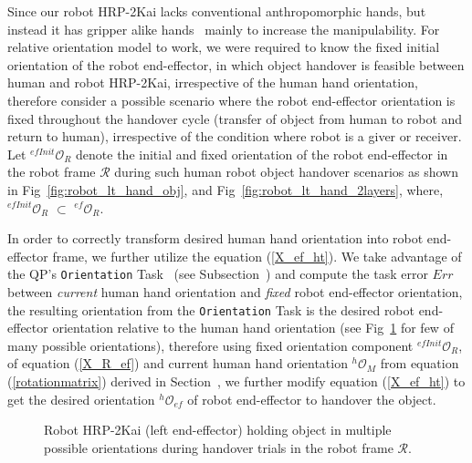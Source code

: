 Since our robot HRP-2Kai lacks conventional anthropomorphic hands, but instead it has gripper alike hands~\cite{kaneko2015humanoid, stasse2019overview} mainly to increase the manipulability. For relative orientation model to work, we were required to know the fixed initial orientation of the robot end-effector, in which object handover is feasible between human and robot HRP-2Kai, irrespective of the human hand orientation, therefore consider a possible  scenario where the robot end-effector orientation is fixed throughout the handover cycle (transfer of object from human to robot and return to human), irrespective of the condition where robot is a giver or receiver. Let ${{}^{efInit}\mathcal{O}_R}$ denote the initial and fixed orientation of the robot end-effector in the robot frame $\mathcal{R}$ during such human robot object handover scenarios as shown in Fig~\ref{fig:robot_lt_hand_obj}, and Fig~\ref{fig:robot_lt_hand_2layers}, where, ${{}^{efInit}\mathcal{O}_R}$ $\subset$ ${{}^{ef}\mathcal{O}_R}$.




In order to correctly transform desired human hand orientation into robot end-effector frame, we further utilize the equation (\ref{X_ef_ht}). We take advantage of the QP's \texttt{Orientation} Task~\cite{murray2017mathematical, ladder-HRP-2Kai} (see Subsection~) and compute the task error $Err$ between \textit{current} human hand orientation and \textit{fixed} robot end-effector orientation, the resulting orientation from the \texttt{Orientation} Task is the desired robot end-effector orientation relative to the human hand orientation (see Fig~\ref{fig:robot_lt_orientations} for few of many possible orientations), therefore using fixed orientation component  ${{}^{efInit}\mathcal{O}_R}$, of equation (\ref{X_R_ef}) and current human hand orientation ${}^{h}\mathcal{O}_M$ from equation (\ref{rotationmatrix}) derived in Section~, we further modify equation (\ref{X_ef_ht}) to get the desired orientation $ {}^{h}\mathcal{O}_{ef} $ of robot end-effector to handover the object.

\begin{figure}[ht]
	\caption{Robot HRP-2Kai (left end-effector) holding object in multiple possible orientations during handover trials in the robot frame $\mathcal{R}$.}
	\label{fig:robot_lt_orientations}
\end{figure} 


